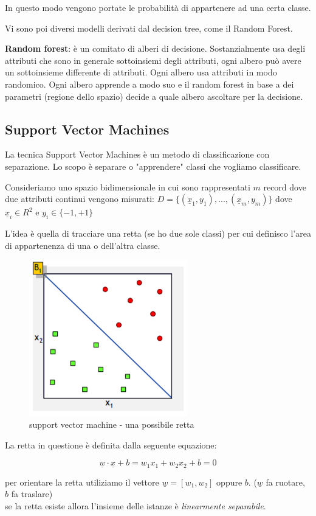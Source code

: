 In questo modo vengono portate le probabilità di appartenere ad una certa classe.	

Vi sono poi diversi modelli derivati dal decision tree, come il Random Forest.
 
\textbf{Random forest}: \`e un comitato di alberi di decisione. Sostanzialmente usa degli attributi che sono in generale sottoinsiemi degli attributi, ogni albero può avere un sottoinsieme differente di attributi. Ogni albero usa attributi in modo randomico. Ogni albero apprende a modo suo e il random forest in base a dei parametri (regione dello spazio) decide a quale albero ascoltare per la decisione. 

\subsection{Support Vector Machines}
La tecnica Support Vector Machines è un metodo di classificazione con separazione. Lo scopo \`e separare o "apprendere" classi che vogliamo classificare. 

Consideriamo uno spazio bidimensionale in cui sono rappresentati $m$ record dove due attributi continui vengono misurati: $D = \{(\underline{x}_1, y_1),...,(\underline{x}_m, y_m)\}$ dove $\underline{x}_i \in R^2$ e $y_i \in \{-1, +1\}$

L'idea è quella di tracciare una retta (se ho due sole classi) per cui definisco l'area di appartenenza di una o dell'altra classe. 

\begin{figure}[H]
	\centering
	\includegraphics[height=0.4 \linewidth]{classification/pict/svm.png}
	\caption{support vector machine - una possibile retta}
\end{figure}

La retta in questione è definita dalla seguente equazione:

\[\underline{w} \cdot \underline{x} + b = w_1 x_1 + w_2 x_2 + b = 0\]

per orientare la retta utiliziamo il vettore $\underline{w} = [w_1,w_2]$ oppure $b$. ($\underline{w}$ fa ruotare, $b$ fa traslare)\\
se la retta esiste allora l'insieme delle istanze è \textit{linearmente separabile}.

